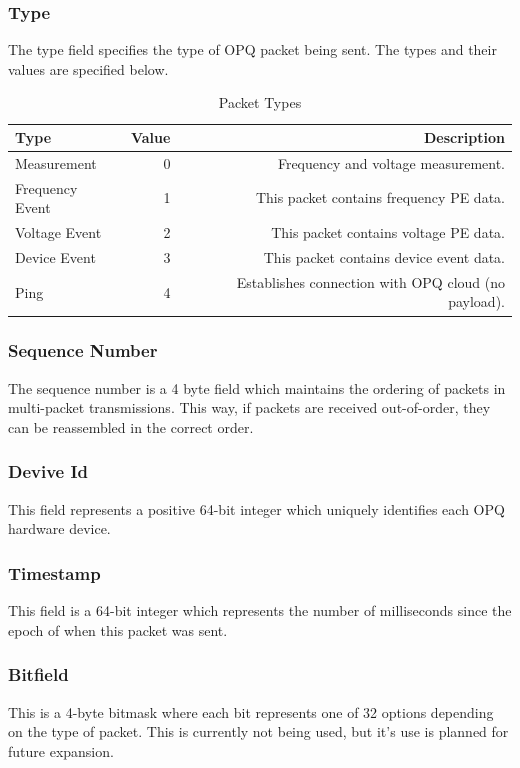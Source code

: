 \documentclass[11pt]{article}
\begin{document}
\subsubsection{Type}
The type field specifies the type of OPQ packet being sent. The types and their values are specified below. 

\begin{table}[htbp]
	\caption{Packet Types}
	\label{tab:packet_types}
	\begin{center}
		\begin{tabular}{|l|r|r|}
			\hline
			\textbf{Type} & \textbf{Value} & \textbf{Description}\\
			\hline
			Measurement & 0 & Frequency and voltage measurement.\\
			\hline
			Frequency Event & 1 & This packet contains frequency PE data.\\
			\hline
			Voltage Event & 2 & This packet contains voltage PE data.\\
			\hline
			Device Event & 3 & This packet contains device event data.\\
			\hline
			Ping & 4 & Establishes connection with OPQ cloud (no payload).\\
			\hline
		\end{tabular}
	\end{center}
\end{table} 

\subsubsection{Sequence Number}
The sequence number is a 4 byte field which maintains the ordering of packets in multi-packet transmissions. This way, if packets are received out-of-order, they can be reassembled in the correct order.

\subsubsection{Devive Id}
This field represents a positive 64-bit integer which uniquely identifies each OPQ hardware device. 

\subsubsection{Timestamp}
This field is a 64-bit integer which represents the number of milliseconds since the epoch of when this packet was sent.

\subsubsection{Bitfield}
This is a 4-byte bitmask where each bit represents one of 32 options depending on the type of packet. This is currently not being used, but it's use is planned for future expansion.
\end{document}
